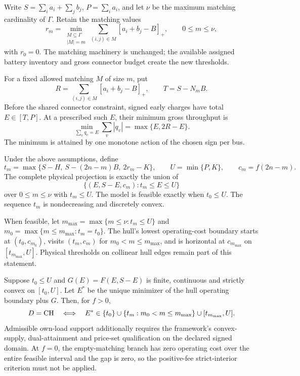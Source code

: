 Write $S=\sum_i a_i+\sum_j b_j$, $P=\sum_i a_i$, and let $\nu$
be the maximum matching cardinality of $\Gamma$. Retain the matching values
\[
 r_m=\min_{\substack{M\subseteq\Gamma\\|M|=m}}
       \sum_{(i,j)\in M}[a_i+b_j-B]_+,
 \qquad 0\le m\le\nu,
\]
with $r_0=0$. The matching machinery is unchanged; the available assigned
battery inventory and gross connector budget create the new thresholds.

\begin{lemma}\label{lem:v2ggross}
For a fixed allowed matching $M$ of size $m$, put
\[
 R=\sum_{(i,j)\in M}[a_i+b_j-B]_+,\qquad T=S-N_mB.
\]
Before the shared connector constraint, signed early charges have total
$E\in[T,P]$. At a prescribed such $E$, their minimum gross throughput is
\begin{equation}\label{eq:v2ggross}
 \min_{\sum_vq_v=E}\sum_v|q_v|=\max\{E,2R-E\}.
\end{equation}
The minimum is attained by one monotone action of the chosen sign per bus.
\end{lemma}

\begin{theorem}\label{thm:v2g}
Under the above assumptions, define
\begin{equation}\label{eq:v2gthresholds}
 t_m=\max\{S-H,\ S-(2n-m)B,\ 2r_m-K\},\qquad
 U=\min\{P,K\},\qquad c_m=f(2n-m).
\end{equation}
The complete physical projection is exactly the union of
\begin{equation}\label{eq:v2gprojection}
 \{(E,S-E,c_m):t_m\le E\le U\}
\end{equation}
over $0\le m\le\nu$ with $t_m\le U$. The model is feasible exactly
when $t_0\le U$. The sequence $t_m$ is nondecreasing and discretely convex.

When feasible, let $m_{\max}=\max\{m\le\nu:t_m\le U\}$ and
$m_0=\max\{m\le m_{\max}:t_m=t_0\}$. The hull's lowest operating-cost
boundary starts at $(t_0,c_{m_0})$, visits $(t_m,c_m)$ for
$m_0<m\le m_{\max}$, and is horizontal at $c_{m_{\max}}$ on
$[t_{m_{\max}},U]$. Physical thresholds on collinear hull edges remain
part of this statement.
\end{theorem}

\begin{corollary}\label{cor:v2gsupport}
Suppose $t_0\le U$ and $G(E)=F(E,S-E)$ is finite, continuous and strictly
convex on $[t_0,U]$. Let $E^*$ be the unique minimizer of the hull
operating boundary plus $G$. Then, for $f>0$,
\[
 D=\mathrm{CH}\quad\Longleftrightarrow\quad
 E^*\in\{t_0\}\cup\{t_m:m_0<m\le m_{\max}\}
             \cup[t_{m_{\max}},U].
\]
Admissible own-load support additionally requires the framework's convex-
supply, dual-attainment and price-set qualification on the declared signed
domain. At $f=0$, the empty-matching branch has zero operating cost over
the entire feasible interval and the gap is zero, so the positive-fee
strict-interior criterion must not be applied.
\end{corollary}

